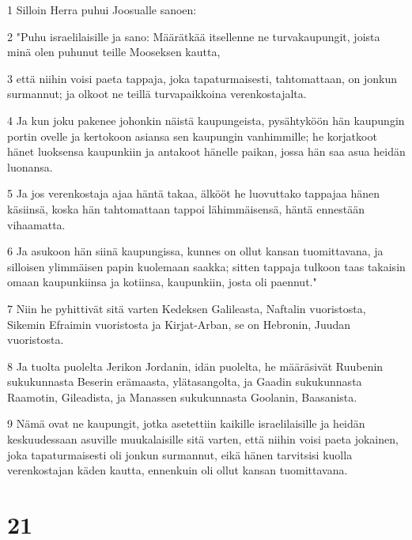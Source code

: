 \par 1 Silloin Herra puhui Joosualle sanoen:
\par 2 "Puhu israelilaisille ja sano: Määrätkää itsellenne ne turvakaupungit, joista minä olen puhunut teille Mooseksen kautta,
\par 3 että niihin voisi paeta tappaja, joka tapaturmaisesti, tahtomattaan, on jonkun surmannut; ja olkoot ne teillä turvapaikkoina verenkostajalta.
\par 4 Ja kun joku pakenee johonkin näistä kaupungeista, pysähtyköön hän kaupungin portin ovelle ja kertokoon asiansa sen kaupungin vanhimmille; he korjatkoot hänet luoksensa kaupunkiin ja antakoot hänelle paikan, jossa hän saa asua heidän luonansa.
\par 5 Ja jos verenkostaja ajaa häntä takaa, älkööt he luovuttako tappajaa hänen käsiinsä, koska hän tahtomattaan tappoi lähimmäisensä, häntä ennestään vihaamatta.
\par 6 Ja asukoon hän siinä kaupungissa, kunnes on ollut kansan tuomittavana, ja silloisen ylimmäisen papin kuolemaan saakka; sitten tappaja tulkoon taas takaisin omaan kaupunkiinsa ja kotiinsa, kaupunkiin, josta oli paennut."
\par 7 Niin he pyhittivät sitä varten Kedeksen Galileasta, Naftalin vuoristosta, Sikemin Efraimin vuoristosta ja Kirjat-Arban, se on Hebronin, Juudan vuoristosta.
\par 8 Ja tuolta puolelta Jerikon Jordanin, idän puolelta, he määräsivät Ruubenin sukukunnasta Beserin erämaasta, ylätasangolta, ja Gaadin sukukunnasta Raamotin, Gileadista, ja Manassen sukukunnasta Goolanin, Baasanista.
\par 9 Nämä ovat ne kaupungit, jotka asetettiin kaikille israelilaisille ja heidän keskuudessaan asuville muukalaisille sitä varten, että niihin voisi paeta jokainen, joka tapaturmaisesti oli jonkun surmannut, eikä hänen tarvitsisi kuolla verenkostajan käden kautta, ennenkuin oli ollut kansan tuomittavana.

\chapter{21}

